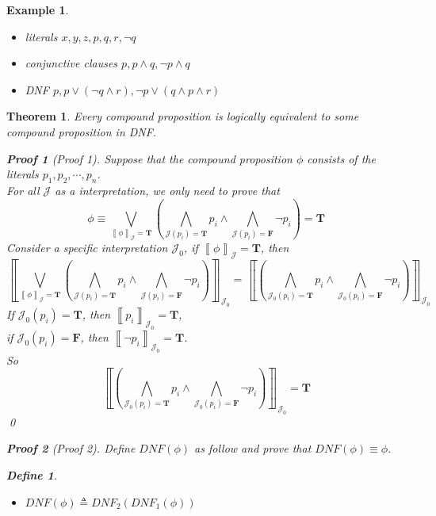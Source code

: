\documentclass{ctexart}
\newcommand{\。}{．} %
\newcommand{\lb}{\left\llbracket}
\newcommand{\rb}{\right\rrbracket}
\newenvironment{huangse}{
    \begin{tcolorbox}[enhanced, colback=qhuang, boxrule=0pt, frame hidden,
        borderline west={0.7mm}{0.1mm}{shuang}]
    }
    {\end{tcolorbox}}
\newenvironment{zise}{
    \begin{tcolorbox}[enhanced, colback=qzi, boxrule=0pt, frame hidden,
        borderline west={0.7mm}{0.1mm}{szi}]
    }
    {\end{tcolorbox}}
\theoremstyle{t} %
\newtheorem{dyhj}{\color{slv} Define}[subsection] %
\newtheorem{dlhj}{\color{shuang} Theorem}[subsection]
\newtheorem{lthj}{\color{szi} Example}[subsection]
\newtheorem*{zmhj}{\color{slan} Proof}
\newenvironment{dl}{\begin{huangse}\begin{dlhj}}{\end{dlhj}\end{huangse}}
\newenvironment{lt}{\begin{zise}\begin{lthj}}{\end{lthj}\end{zise}}
\begin{document}
\begin{lt} \quad
    \begin{itemize}
        \item literals $x, y, z, p, q, r, \lnot q$
        \item conjunctive clauses $p, p \land q, \lnot p \land q$
        \item DNF $p, p \lor (\lnot q \land r), \lnot p \lor (q \land p \land r)$
    \end{itemize}
\end{lt}

\begin{dl}
    Every compound proposition is logically equivalent to some compound proposition in DNF.
    \begin{zmhj}[Proof 1]
        Suppose that the compound proposition $\phi$ consists of the literals $p_1, p_2, \cdots, p_n$. \\
        For all $\mathcal{J}$ as a interpretation, we only need to prove that 
        \[
            \phi \equiv \bigvee_{\lb \phi \rb_\mathcal{J} = \mathbf{T}}\left(\bigwedge_{\mathcal{J}(p_i) = \mathbf{T}}p_i \land \bigwedge_{\mathcal{J}(p_i) = \mathbf{F}}\lnot p_i \right) = \mathbf{T}
        \]
        Consider a specific interpretation $\mathcal{J}_0$, if $\lb \phi\rb_\mathcal{J} = \mathbf{T}$, then
        \[
            \left\llbracket \bigvee_{\lb \phi \rb_\mathcal{J} = \mathbf{T}}\left(\bigwedge_{\mathcal{J}(p_i) = \mathbf{T}}p_i \land \bigwedge_{\mathcal{J}(p_i) = \mathbf{F}}\lnot p_i \right) \right\rrbracket_{\mathcal{J}_0} 
             = \lb \left(\bigwedge_{\mathcal{J}_0(p_i) = \mathbf{T}}p_i \land \bigwedge_{\mathcal{J}_0(p_i) = \mathbf{F}}\lnot p_i\right)\rb_{\mathcal{J}_0} 
        \]
        If $\mathcal{J}_0(p_i) = \mathbf{T}$, then $\lb p_i \rb_{\mathcal{J_0}} = \mathbf{T}$, \\
        if $\mathcal{J}_0(p_i) = \mathbf{F}$, then $\lb \lnot p_i \rb_{\mathcal{J_0}} = \mathbf{T}$. \\
        So
        \[
            \lb \left(\bigwedge_{\mathcal{J}_0(p_i) = \mathbf{T}}p_i \land \bigwedge_{\mathcal{J}_0(p_i) = \mathbf{F}}\lnot p_i\right)\rb_{\mathcal{J}_0} = \mathbf{T}
        \]
        \qed
    \end{zmhj}
    \begin{zmhj}[Proof 2]
        Define $DNF(\phi)$ as follow and prove that $DNF(\phi) \equiv \phi$. 
        \begin{dyhj}
            \begin{itemize}
                \item $DNF(\phi) \triangleq DNF_2(DNF_1(\phi))$

\end{itemize}
\end{dyhj}
\end{zmhj}
\end{dl}
\end{document}
